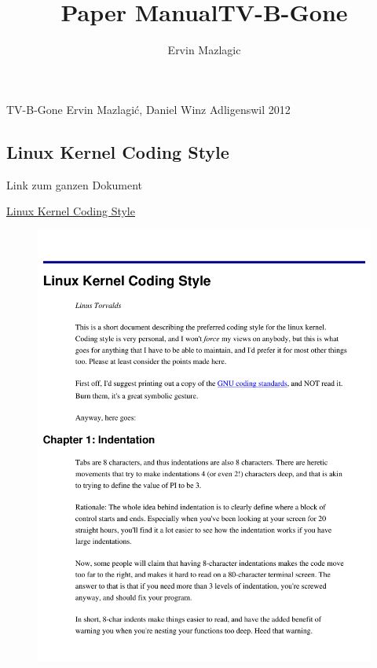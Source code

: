 \documentclass[a4paper,
               10pt,
               fleqn]{article}
\author{Ervin Mazlagic}
\title{Paper Manual}
\title{TV-B-Gone}
\begin{document}
         {TV-B-Gone}
         {Ervin Mazlagi\'c, Daniel Winz}
         {Adligenswil}
         {2012}

\tableofcontents
\newpage

\tableofcontents





% 
% 
% 
% 



\begin{appendix}
    \clearpage
    \newpage

    \section{Linux Kernel Coding Style}
    Link zum ganzen Dokument 

    \href{https://computing.llnl.gov/linux/slurm/coding_style.pdf}{
        Linux Kernel Coding Style}
    \begin{figure}[h!]
    \includegraphics[page=1, width=1\textwidth]{kernelstyle.pdf}
    \end{figure}
    \newpage


\end{appendix}
\end{document}
